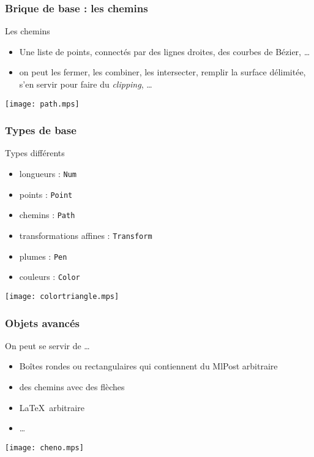 \documentclass[nodefaultblocks]{beamer}
\begin{document}
\begin{frame}\frametitle{Brique de base : les chemins}
  \begin{block}{Les chemins}
    \begin{itemize}
      \item Une liste de points, connectés par des lignes droites, des courbes
        de Bézier, \dots
      \item on peut les fermer, les combiner, les intersecter, remplir la
        surface délimitée, s'en servir pour faire du {\em clipping}, \dots
    \end{itemize}
  \end{block}
  \begin{center}
  \texttt{[image: path.mps]}
  \end{center}
\end{frame}

\begin{frame}\frametitle{Types de base}

  \begin{block}{Types différents}
    \begin{itemize}
      \item longueurs : {\tt Num}
      \item points : {\tt Point}
      \item chemins : {\tt Path}
      \item transformations affines : {\tt Transform}
      \item plumes : {\tt Pen}
      \item couleurs : {\tt Color}
    \end{itemize}
  \end{block}

  \begin{center}
    \texttt{[image: colortriangle.mps]}
  \end{center}
  
\end{frame}

\begin{frame}\frametitle{Objets avancés}
  \begin{block}{On peut se servir de \dots}
    \begin{itemize}
      \item Boîtes rondes ou rectangulaires qui contiennent du MlPost
        arbitraire
      \item des chemins avec des flèches
      \item \LaTeX\ arbitraire 
      \item \dots 
    \end{itemize}
  \end{block}
  \bigskip
  \begin{center}
    \texttt{[image: cheno.mps]}
  \end{center}
  
\end{frame}
\end{document}
